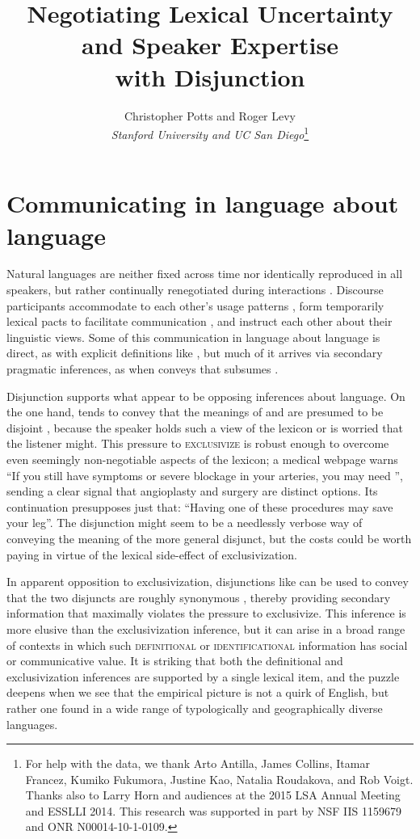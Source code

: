 \documentclass[12pt,twoside]{article}
\title{Negotiating Lexical Uncertainty and Speaker Expertise\\ with Disjunction}				%
\author{\sc Christopher Potts and Roger Levy\\ 						%
{\it Stanford University and UC San Diego}\footnote{For help with the data, we thank Arto Antilla, James Collins, Itamar Francez, Kumiko Fukumora, Justine Kao, Natalia Roudakova, and Rob Voigt. 
Thanks also to Larry Horn and audiences at the 2015 LSA Annual Meeting and ESSLLI 2014. This research was supported in part by NSF IIS 1159679 and ONR N00014-10-1-0109.}} %
\date{}
\renewcommand{\_}{\textbf{\textunderscore\hspace{-4pt}\textunderscore\hspace{-3pt}\textunderscore\hspace{-4pt}\textunderscore}\hspace{0.5pt}}			%
\newcommand{\technicalTerm}[1]{\textsc{#1}}
\begin{document}
\maketitle
\thispagestyle{empty}	
			


\section{Communicating in language about language}\label{sec:introduction}

Natural languages are neither fixed across time nor identically
reproduced in all speakers, but rather continually renegotiated during
interactions \citep{Clark97}. Discourse participants accommodate to
each other's usage patterns \citep{Giles:Coupland:Coupland:1991}, form
temporarily lexical pacts to facilitate communication
\citep{Clark:Wilkes-Gibbs:1986,Brennan:Clark:1996}, and instruct each
other about their linguistic views. Some of this communication in
language about language is direct, as with explicit definitions like
, but much of it arrives via
secondary pragmatic inferences, as when  conveys
that  subsumes  \citep{Hearst92,SnowEtAl05}.

Disjunction supports what appear to be opposing inferences about
language. On the one hand,  tends to convey that the
meanings of  and  are presumed to be disjoint
\citep{Hurford:1974}, because the speaker holds such a view of the
lexicon or is worried that the listener might. This pressure to
\technicalTerm{exclusivize} is robust enough to overcome even seemingly non-negotiable
aspects of the lexicon; a medical webpage warns ``If you still have
symptoms or severe blockage in your arteries, you may need
'', sending a clear signal that
angioplasty and surgery are distinct options. Its continuation
presupposes just that: ``Having one of these procedures may save your
leg''. The disjunction might seem to be a needlessly verbose way of
conveying the meaning of the more general disjunct, but the costs
could be worth paying in virtue of the lexical side-effect of
exclusivization.

In apparent opposition to exclusivization, disjunctions like
 can be used to convey that the two
disjuncts are roughly synonymous \citep{Horn89}, thereby providing
secondary information that maximally violates the pressure to
exclusivize. This inference is more elusive than the exclusivization
inference, but it can arise in a broad range of contexts in which such
\technicalTerm{definitional} or \technicalTerm{identificational} information has social or
communicative value. It is striking that both the definitional and
exclusivization inferences are supported by a single lexical item, and
the puzzle deepens when we see that the empirical picture is not a
quirk of English, but rather one found in a wide range of
typologically and geographically diverse languages.
\end{document}
